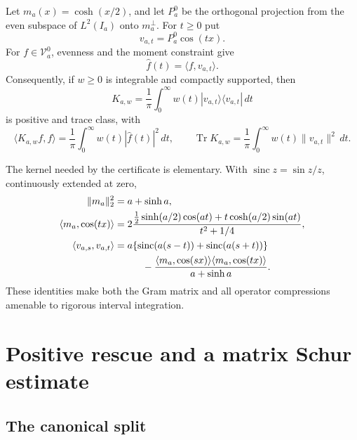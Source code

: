 \documentclass[11pt]{article}
\theoremstyle{remark}
\DeclareMathOperator{\Tr}{Tr}
\DeclareMathOperator{\sinc}{sinc}
\begin{document}
Let \(m_a(x)=\cosh(x/2)\), and let \(P_a^0\) be the orthogonal projection from the even subspace of \(L^2(I_a)\) onto \(m_a^\perp\).
For \(t\geq0\) put
\begin{equation}
       v_{a,t}=P_a^0\cos(tx).
\label{pub-eq-projected-feature}
\end{equation}
For \(f\in\mathcal V_a^0\), evenness and the moment constraint give
\begin{equation}
       \widehat f(t)=\langle f,v_{a,t}\rangle.
\label{pub-eq-analysis-feature}
\end{equation}
Consequently, if \(w\geq0\) is integrable and compactly supported, then
\begin{equation}
 K_{a,w}=\frac1\pi\int_0^\infty
       w(t)|v_{a,t}\rangle\langle v_{a,t}|\,dt
\label{pub-eq-frame-operator}
\end{equation}
is positive and trace class, with
\begin{equation}
 \langle K_{a,w}f,f\rangle=\frac1\pi\int_0^\infty
       w(t)|\widehat f(t)|^2\,dt,
 \qquad
 \Tr K_{a,w}=\frac1\pi\int_0^\infty
       w(t)\lVert v_{a,t}\rVert^2\,dt.
 \label{pub-eq-frame-form-trace}
\end{equation}

The kernel needed by the certificate is elementary.
With \(\sinc z=\sin z/z\), continuously extended at zero,
\begin{align}
 \lVert m_a\rVert_2^2&=a+\sinh a,
 \label{pub-eq-moment-norm}\\
 \langle m_a,\cos(tx)\rangle
 &=2\frac{\frac12\sinh(a/2)\cos(at)
       +t\cosh(a/2)\sin(at)}{t^2+1/4},
 \label{pub-eq-moment-cosine}\\
 \langle v_{a,s},v_{a,t}\rangle
 &=a\{\sinc(a(s-t))+
       \sinc(a(s+t))\}
 \notag\\
 &\hspace{1cm}-
 \frac{\langle m_a,\cos(sx)\rangle
       \langle m_a,\cos(tx)\rangle}{a+\sinh a}.
 \label{pub-eq-projected-kernel}
\end{align}
These identities make both the Gram matrix and all operator compressions amenable to rigorous interval integration.

\section{Positive rescue and a matrix Schur estimate}
\label{pub-sec-rescue}

\subsection{The canonical split}
\end{document}

